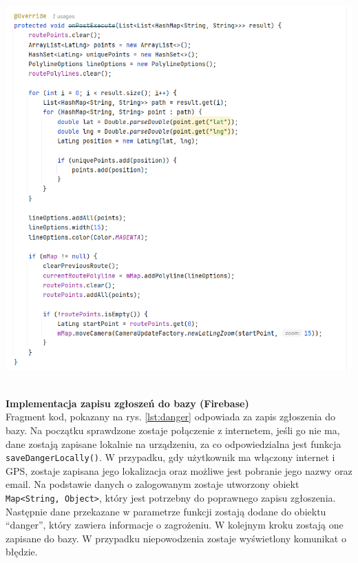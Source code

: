 \noindent
\begin{minipage}{\linewidth}
    \label{lst:rystras}
    \centering
    \includegraphics[width=0.8\linewidth]{img/kod/rys-tras.png}
\end{minipage}
\\

\textbf{Implementacja zapisu zgłoszeń do bazy (Firebase)} \\ 
Fragment kod, pokazany na rys. \ref{lst:danger} odpowiada za zapis zgłoszenia do bazy. Na początku sprawdzone zostaje połączenie z internetem, jeśli go nie ma, dane zostają zapisane lokalnie na urządzeniu, za co odpowiedzialna jest funkcja \verb|saveDangerLocally()|. W przypadku, gdy użytkownik ma włączony internet i GPS, zostaje zapisana jego lokalizacja oraz możliwe jest pobranie jego nazwy oraz email. Na podstawie danych o zalogowanym zostaje utworzony obiekt  \verb|Map<String, Object>|, który jest potrzebny do poprawnego zapisu zgłoszenia. Następnie dane przekazane w parametrze funkcji zostają dodane do obiektu “danger”, który zawiera informacje o zagrożeniu. W kolejnym kroku zostają one zapisane do bazy. W przypadku niepowodzenia zostaje wyświetlony komunikat o błędzie. \\


